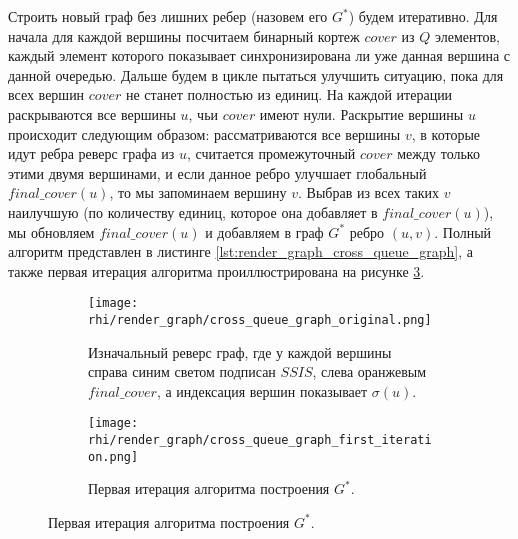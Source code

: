 Строить новый граф без лишних ребер (назовем его $G^*$) будем итеративно. Для начала для каждой вершины посчитаем бинарный кортеж $cover$ из $Q$ элементов, каждый элемент которого показывает синхронизирована ли уже данная вершина с данной очередью. Дальше будем в цикле пытаться улучшить ситуацию, пока для всех вершин $cover$ не станет полностью из единиц. На каждой итерации раскрываются все вершины $u$, чьи $cover$ имеют нули. Раскрытие вершины $u$ происходит следующим образом: рассматриваются все вершины $v$, в которые идут ребра реверс графа из $u$, считается промежуточный $cover$ между только этими двумя вершинами, и если данное ребро улучшает глобальный $final\_cover(u)$, то мы запоминаем вершину $v$. Выбрав из всех таких $v$ наилучшую (по количеству единиц, которое она добавляет в $final\_cover(u)$), мы обновляем $final\_cover(u)$ и добавляем в граф $G^*$ ребро $(u, v)$. Полный алгоритм представлен в листинге \ref{lst:render_graph_cross_queue_graph}, а также первая итерация алгоритма проиллюстрирована на рисунке \ref{fig:cross_queue_graph_first_iteration}.
\begin{figure}[htp]
    \begin{subfigure}
        \centering
        \texttt{[image: rhi/render\_graph/cross\_queue\_graph\_original.png]}
        \caption{Изначальный реверс граф, где у каждой вершины справа синим светом подписан $SSIS$, слева оранжевым $final\_cover$, а индексация вершин показывает $\sigma(u)$.}
        \label{fig:cross_queue_graph_original}
    \end{subfigure}
    \bigskip
    \bigskip
    \begin{subfigure}
        \centering
        \texttt{[image: rhi/render\_graph/cross\_queue\_graph\_first\_iteration.png]}
        \caption{Первая итерация алгоритма построения $G^*$.}
        \label{fig:cross_queue_graph_first_iteration}
    \end{subfigure}
\end{figure}

